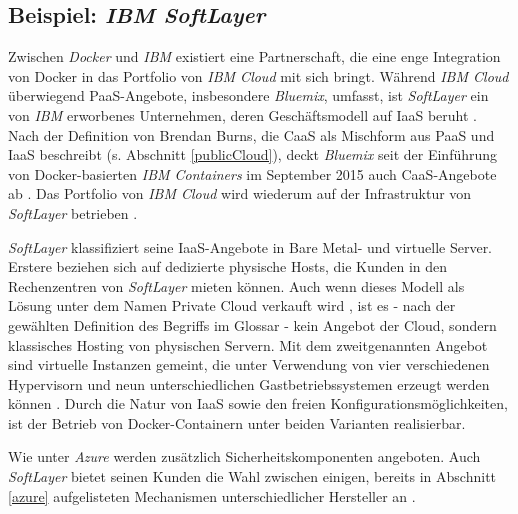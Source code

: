 \documentclass[../main.tex]{subfiles}
\begin{document}
    \subsection{Beispiel: \emph{IBM SoftLayer}}
    \label{softlayer}
      Zwischen \emph{Docker} und \emph{IBM} existiert eine Partnerschaft, die eine enge Integration von Docker in das Portfolio von \emph{IBM Cloud} mit sich bringt. Während \emph{IBM Cloud} überwiegend PaaS-Angebote, insbesondere \emph{Bluemix}, umfasst, ist \emph{SoftLayer} ein von \emph{IBM} erworbenes Unternehmen, deren Geschäftsmodell auf IaaS beruht \cite{IBMDockerServices}. Nach der Definition von Brendan Burns, die CaaS als Mischform aus PaaS und IaaS beschreibt (s. Abschnitt \ref{publicCloud}), deckt \emph{Bluemix} seit der Einführung von Docker-basierten \emph{IBM Containers} im September 2015 auch CaaS-Angebote ab \cite{IBMContainerLaunch}. Das Portfolio von \emph{IBM Cloud} wird wiederum auf der Infrastruktur von \emph{SoftLayer} betrieben \cite{IBMPartnershipDocker}.

      \emph{SoftLayer} klassifiziert seine IaaS-Angebote in Bare Metal- und virtuelle Server. Erstere beziehen sich auf dedizierte physische Hosts, die Kunden in den Rechenzentren von \emph{SoftLayer} mieten können. Auch wenn dieses Modell als Lösung unter dem Namen Private Cloud verkauft wird \cite{softlayerPrivateCloud}, ist es - nach der gewählten Definition des Begriffs im Glossar - kein Angebot der Cloud, sondern klassisches Hosting von physischen Servern.
      Mit dem zweitgenannten Angebot sind virtuelle Instanzen gemeint, die unter Verwendung von vier verschiedenen Hypervisorn und neun unterschiedlichen Gastbetriebssystemen erzeugt werden können \cite{softlayerSoftware}. Durch die Natur von IaaS sowie den freien Konfigurationsmöglichkeiten, ist der Betrieb von Docker-Containern unter beiden Varianten realisierbar.

      Wie unter \emph{Azure} werden zusätzlich Sicherheitskomponenten angeboten. Auch \emph{SoftLayer} bietet seinen Kunden die Wahl zwischen einigen, bereits in Abschnitt \ref{azure} aufgelisteten Mechanismen unterschiedlicher Hersteller an \cite{softlayerSoftwareSec}.
\end{document}
